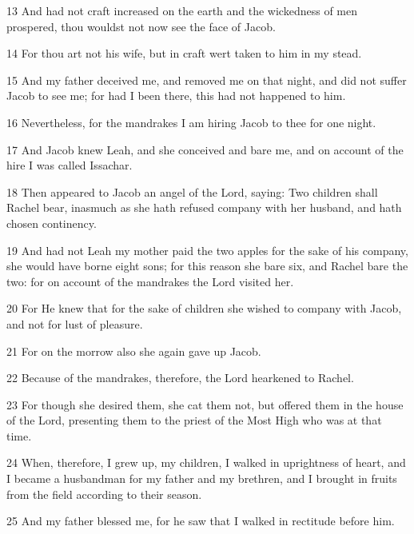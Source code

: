 \par 13 And had not craft increased on the earth and the wickedness of men prospered, thou wouldst not now see the face of Jacob.

\par 14 For thou art not his wife, but in craft wert taken to him in my stead.

\par 15 And my father deceived me, and removed me on that night, and did not suffer Jacob to see me; for had I been there, this had not happened to him.

\par 16 Nevertheless, for the mandrakes I am hiring Jacob to thee for one night.

\par 17 And Jacob knew Leah, and she conceived and bare me, and on account of the hire I was called Issachar.

\par 18 Then appeared to Jacob an angel of the Lord, saying: Two children shall Rachel bear, inasmuch as she hath refused company with her husband, and hath chosen continency.

\par 19 And had not Leah my mother paid the two apples for the sake of his company, she would have borne eight sons; for this reason she bare six, and Rachel bare the two: for on account of the mandrakes the Lord visited her.

\par 20 For He knew that for the sake of children she wished to company with Jacob, and not for lust of pleasure.

\par 21 For on the morrow also she again gave up Jacob.

\par 22 Because of the mandrakes, therefore, the Lord hearkened to Rachel.

\par 23 For though she desired them, she cat them not, but offered them in the house of the Lord, presenting them to the priest of the Most High who was at that time.

\par 24 When, therefore, I grew up, my children, I walked in uprightness of heart, and I became a husbandman for my father and my brethren, and I brought in fruits from the field according to their season.

\par 25 And my father blessed me, for he saw that I walked in rectitude before him.

